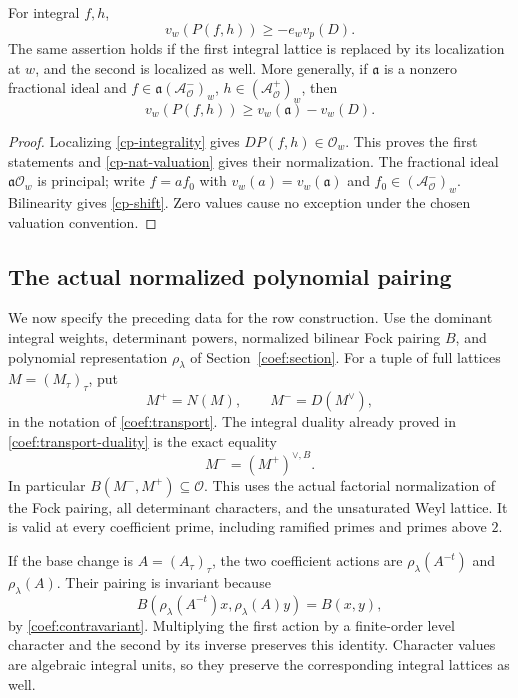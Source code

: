 \begin{corollary}\label{cp-local}
For integral $f,h$,
\[
                 v_w(P(f,h))\ge -e_wv_p(D).
\]
The same assertion holds if the first integral lattice is
replaced by its localization at $w$, and the second is
localized as well.
More generally, if $\mathfrak a$ is a nonzero fractional
ideal and $f\in\mathfrak a(\mathcal A^-_{\mathcal O})_w$,
$h\in(\mathcal A^+_{\mathcal O})_w$, then
\begin{equation}\label{cp-shift}
                  v_w(P(f,h))\ge v_w(\mathfrak a)-v_w(D).
\end{equation}
\end{corollary}
\begin{proof}
Localizing \eqref{cp-integrality} gives
$DP(f,h)\in\mathcal O_w$. This proves the first statements
and \eqref{cp-nat-valuation} gives their normalization.
The fractional ideal $\mathfrak a\mathcal O_w$ is principal;
write $f=a f_0$ with $v_w(a)=v_w(\mathfrak a)$ and
$f_0\in(\mathcal A^-_{\mathcal O})_w$. Bilinearity gives
\eqref{cp-shift}. Zero values cause no exception under the
chosen valuation convention.
\end{proof}

\subsection{The actual normalized polynomial pairing}

We now specify the preceding data for the row construction.
Use the dominant integral weights, determinant powers,
normalized bilinear Fock pairing $B$, and polynomial
representation $\rho_\lambda$ of Section~\ref{coef:section}.
For a tuple of full lattices $M=(M_\tau)_\tau$, put
\[
                M^+=N(M),\qquad M^-=D(M^\vee),
\]
in the notation of \eqref{coef:transport}. The integral
duality already proved in \eqref{coef:transport-duality} is
the exact equality
\begin{equation}\label{cp-polynomial-dual}
                     M^-=(M^+)^{\vee,B}.
\end{equation}
In particular $B(M^-,M^+)\subseteq\mathcal O$.
This uses the actual factorial normalization of the Fock
pairing, all determinant characters, and the unsaturated
Weyl lattice. It is valid at every coefficient prime,
including ramified primes and primes above $2$.

If the base change is $A=(A_\tau)_\tau$, the two coefficient
actions are $\rho_\lambda(A^{-t})$ and
$\rho_\lambda(A)$. Their pairing is invariant because
\[
 B(\rho_\lambda(A^{-t})x,\rho_\lambda(A)y)=B(x,y),
\]
by \eqref{coef:contravariant}. Multiplying the first action
by a finite-order level character and the second by its
inverse preserves this identity. Character values are
algebraic integral units, so they preserve the corresponding
integral lattices as well.


